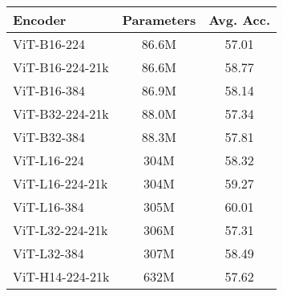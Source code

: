 \begin{tabular}{l c c }
\toprule
\textbf{Encoder} & \textbf{Parameters} & \textbf{Avg. Acc.} \\ \midrule
ViT-B16-224 & 86.6M & 57.01\\
ViT-B16-224-21k & 86.6M & 58.77\\
ViT-B16-384 & 86.9M & 58.14\\
ViT-B32-224-21k & 88.0M & 57.34\\
ViT-B32-384 & 88.3M & 57.81\\
ViT-L16-224 & 304M & 58.32\\
ViT-L16-224-21k & 304M & 59.27\\
ViT-L16-384 & 305M & 60.01\\
ViT-L32-224-21k & 306M & 57.31\\
ViT-L32-384 & 307M & 58.49\\
ViT-H14-224-21k & 632M & 57.62\\
\bottomrule
\end{tabular}
